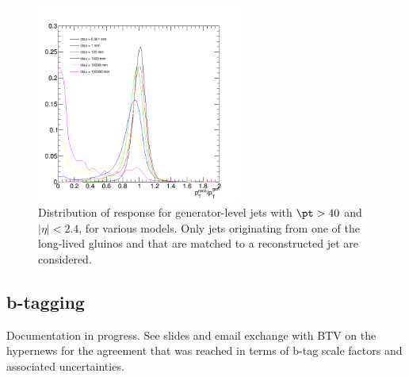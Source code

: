 \begin{figure}
  \begin{center}
    \includegraphics[width=0.6\textwidth]{figures/LLPResults/T1qqqqLL_response}
    \caption{Distribution of response for generator-level jets with
      $\pt>40$ and $|\eta|<2.4$, for various \ctau models. Only jets
      originating from one of the long-lived gluinos and that are
      matched to a reconstructed jet are considered.}
    \label{fig:T1qqqq:response}
  \end{center}
\end{figure}

\subsection{b-tagging}
\label{app:LLP-btagging}

Documentation in progress. See slides and email exchange with BTV on the
hypernews for the agreement that was reached in terms of b-tag scale factors 
and associated uncertainties.


